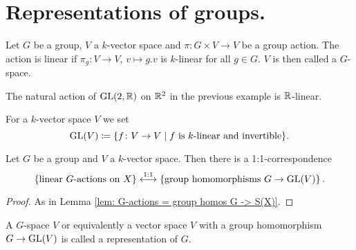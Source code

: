 \section{Representations of groups.}


\begin{defi}
  Let $G$ be a group, $V$ a $k$-vector space and $\pi \colon G \times V \to V$ be a group action.
  The action is linear if $\pi_g \colon V \to V$, $v \mapsto g.v$ is $k$-linear for all $g \in G$.
  $V$ is then called a $G$-space.
\end{defi}


\begin{expl}
  The natural action of $\operatorname{GL}(2,\mathbb{R})$ on $\mathbb{R}^2$ in the previous example is $\mathbb{R}$-linear.
\end{expl}


For a $k$-vector space $V$ we set
\[
            \operatorname{GL}(V)
  \coloneqq \{
              f \colon V \to V
            \mid
              f \text{ is $k$-linear and invertible}
            \}.
\]


\begin{lem}
  Let $G$ be a group and $V$ a $k$-vector space.
  Then there is a 1:1-correspondence
  \[
    \left\{
      \text{linear $G$-actions on $X$}
    \right\}
    \overset{1:1}{\longleftrightarrow}
    \left\{
      \text{group homomorphisms $G \to \operatorname{GL}(V)$}
    \right\}.
  \]
\end{lem}
\begin{proof}
  As in Lemma \ref{lem: G-actions = group homos G -> S(X)}.
\end{proof}


\begin{rem}
  A $G$-space $V$ or equivalently a vector space $V$ with a group homomorphism $G \to \operatorname{GL}(V)$ is called a representation of $G$.
\end{rem}


